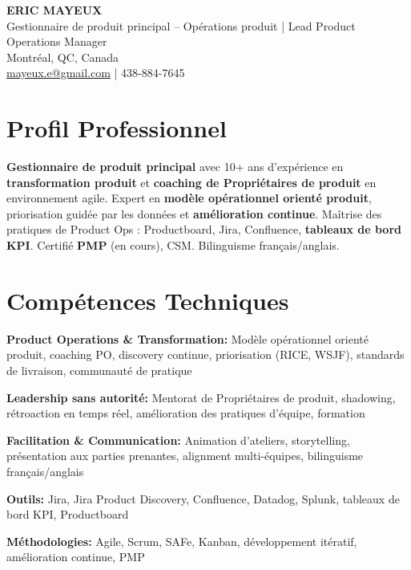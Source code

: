 \documentclass[11pt,a4paper]{article}
\begin{document}
\begin{center}
    {\LARGE \textbf{ERIC MAYEUX}}\\
    \vspace{4pt}
    {\large Gestionnaire de produit principal -- Opérations produit | Lead Product Operations Manager}\\
    \vspace{4pt}
    Montréal, QC, Canada\\
    \href{mailto:mayeux.e@gmail.com}{mayeux.e@gmail.com} | 438-884-7645
\end{center}

\vspace{8pt}

\section*{Profil Professionnel}
\noindent
\textbf{Gestionnaire de produit principal} avec 10+ ans d'expérience en \textbf{transformation produit} et \textbf{coaching de Propriétaires de produit} en environnement agile. Expert en \textbf{modèle opérationnel orienté produit}, priorisation guidée par les données et \textbf{amélioration continue}. Maîtrise des pratiques de Product Ops : Productboard, Jira, Confluence, \textbf{tableaux de bord KPI}. Certifié \textbf{PMP} (en cours), CSM. Bilinguisme français/anglais.

\section*{Compétences Techniques}

\textbf{Product Operations \& Transformation:} Modèle opérationnel orienté produit, coaching PO, discovery continue, priorisation (RICE, WSJF), standards de livraison, communauté de pratique

\textbf{Leadership sans autorité:} Mentorat de Propriétaires de produit, shadowing, rétroaction en temps réel, amélioration des pratiques d'équipe, formation

\textbf{Facilitation \& Communication:} Animation d'ateliers, storytelling, présentation aux parties prenantes, alignment multi-équipes, bilinguisme français/anglais

\textbf{Outils:} Jira, Jira Product Discovery, Confluence, Datadog, Splunk, tableaux de bord KPI, Productboard

\textbf{Méthodologies:} Agile, Scrum, SAFe, Kanban, développement itératif, amélioration continue, PMP
\end{document}
